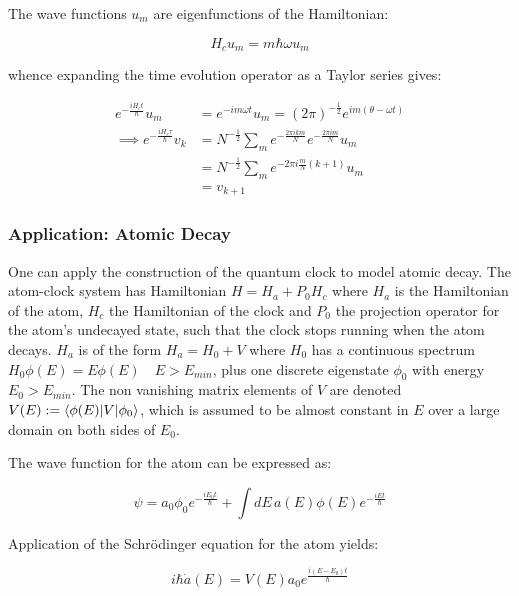\documentclass{article}
\begin{document}
\noindent The wave functions $u_m$ are eigenfunctions of the Hamiltonian:

\begin{equation}
	H_cu_m = m\hbar\omega u_m
	\label{clockwavefunctions}
\end{equation}

\noindent whence expanding the time evolution operator as a Taylor series gives:

\begin{align}
	e^{-\frac{iH_ct}{\hbar}}u_m &= e^{-im\omega t}u_m = (2\pi)^{-\frac{1}{2}}e^{im(\theta-\omega t)} \\
	\implies e^{-\frac{iH_c\tau}{\hbar}}v_k &= N^{-\frac{1}{2}}\sum_{m}e^{-\frac{2\pi ikm}{N}}e^{-\frac{2\pi im}{N}}u_m \\
						       &= N^{-\frac{1}{2}}\sum_{m}e^{-2\pi i \frac{m}{N}(k+1)}u_m \\
						       &= v_{k+1}
\end{align}

\subsubsection{Application: Atomic Decay}
One can apply the construction of the quantum clock to model atomic decay. The atom-clock system has Hamiltonian $H=H_a+P_0H_c$ where $H_a$ is the Hamiltonian of the atom, $H_c$ the Hamiltonian of the clock and $P_0$ the projection operator for the atom's undecayed state, such that the clock stops running when the atom decays. $H_a$ is of the form $H_a=H_0+V$ where $H_0$ has a continuous spectrum $H_0\phi(E) = E\phi(E) \quad E>E_{min}$, plus one discrete eigenstate $\phi_0$ with energy $E_0>E_{min}$. The non vanishing matrix elements of $V$ are denoted $V(E) := \braket{\phi(E)|V|\phi_0}$, which is assumed to be almost constant in $E$ over a large domain on both sides of $E_0$.

\noindent The wave function for the atom can be expressed as:

\begin{equation}
	\psi = a_0\phi_0e^{-\frac{iE_0t}{\hbar}}+\int dE\, a(E)\phi(E)e^{-\frac{iEt}{\hbar}}
\end{equation}

\noindent Application of the Schr{\"o}dinger equation for the atom yields:

\begin{equation}
	i\hbar \dot{a}(E) = V(E)a_0e^{\frac{i(E-E_0)t}{\hbar}}
	\label{aODE}
\end{equation}
\end{document}
